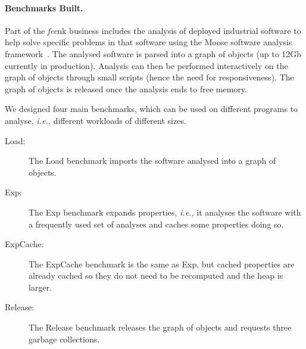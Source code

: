 \documentclass[sigplan,10pt,review,anonymous]{acmart}\settopmatter{printfolios=true,printccs=false,printacmref=false}
\def\feenk{\textit{fee}\textsf{nk}\xspace}
\def\ie{\emph{i.e., }}
\begin{document}


\paragraph{Benchmarks Built.} Part of the \feenk business includes the analysis of deployed industrial software to help solve specific problems in that software using the Moose software analysis framework~\cite{MooseBook1,MoosePaper1}. The analysed software is parsed into a graph of objects (up to 12Gb currently in production). Analysis can then be performed interactively on the graph of objects through small scripts (hence the need for responsiveness). The graph of objects is released once the analysis ends to free memory. 

We designed four main benchmarks, which can be used on different programs to analyse, \ie different workloads of different sizes. 
\begin{description}
	\item[Load:] The Load benchmark imports the software analysed into a graph of objects.
	\item[Exp:] The Exp benchmark expands properties, \ie it analyses the software with a frequently used set of analyses %
	and caches some properties doing so.	
	\item[ExpCache:] The ExpCache benchmark is the same as Exp, but cached properties are already cached so they do not need to be recomputed and the heap is larger.
	\item[Release:] The Release benchmark releases the graph of objects and requests three garbage collections.
\end{description}

\end{document}
